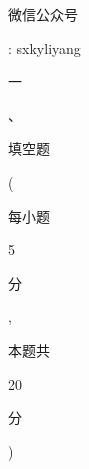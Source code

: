\documentclass[10pt]{article}
\begin{document}
\begin{CJK}{UTF8}{mj}微信公众号\end{CJK}: sxkyliyang

\begin{CJK}{UTF8}{mj}一\end{CJK}、\begin{CJK}{UTF8}{mj}填空题\end{CJK} (\begin{CJK}{UTF8}{mj}每小题\end{CJK} 5 \begin{CJK}{UTF8}{mj}分\end{CJK}, \begin{CJK}{UTF8}{mj}本题共\end{CJK} 20 \begin{CJK}{UTF8}{mj}分\end{CJK})
\end{document}
